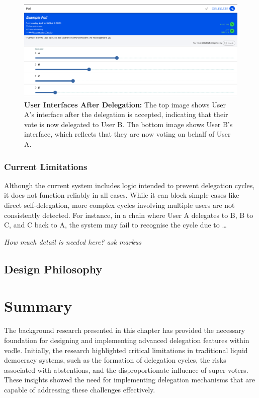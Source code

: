 \begin{enumerate}
\begin{figure} [H]
    \includegraphics[width=0.8\linewidth]{../common/initial_vodle_screenshots/userB_after.png}
    \caption{\textbf{User Interfaces After Delegation:} The top image shows User A's interface after the delegation is accepted, indicating that their vote is now delegated to User B. The bottom image shows User B's interface, which reflects that they are now voting on behalf of User A.}
    \label{fig:delaccept_initial}
\end{figure}

\end{enumerate}

\subsubsection*{Current Limitations}

Although the current system includes logic intended to prevent delegation cycles, it does not function reliably in all cases. While it can block simple cases like direct self-delegation, more complex cycles involving multiple users are not consistently detected. For instance, in a chain where User A delegates to B, B to C, and C back to A, the system may fail to recognise the cycle due to \dots

\textit{How much detail is needed here? ask markus}
\subsection{Design Philosophy}


\section{Summary}
The background research presented in this chapter has provided the necessary foundation for designing and implementing advanced delegation features within vodle. Initially, the research highlighted critical limitations in traditional liquid democracy systems, such as the formation of delegation cycles, the risks associated with abstentions, and the disproportionate influence of super-voters. These insights showed the need for implementing delegation mechanisms that are capable of addressing these challenges effectively.

